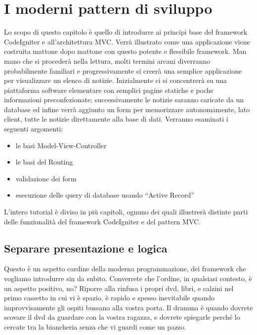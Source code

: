 \chapter{I moderni pattern di sviluppo}
\label{cap:pattern}

Lo scopo di questo capitolo è quello di introdurre ai principi base del framework CodeIgniter e all'architettura \ac{MVC}. Verrà illustrato come una applicazione viene costruita mattone dopo mattone con questo potente e flessibile framework. Man mano che si procederà nella lettura, molti termini arcani diverranno probabilmente familiari e progressivamente si creerà una semplice applicazione per visualizzare un elenco di notizie. Inizialmente ci si concentrerà su una piattaforma software elementare con semplici pagine statiche e poche informazioni preconfezionate; successivamente le notizie saranno caricate da un database ed infine verrà aggiunto un form per memorizzare autonomamente, lato client, tutte le notizie direttamente alla base di dati. Verranno esaminati i seguenti argomenti:

\begin{itemize}
\item le basi Model-View-Controller
\item le basi del Routing
\item validazione dei form
\item esecuzione delle query di database usando “Active Record”
\end{itemize}

L'intero tutorial è diviso in più capitoli, ognuno dei quali illustrerà distinte parti delle funzionalità del framework CodeIgniter e del pattern \ac{MVC}.

\section{Separare presentazione e logica}
Questo è un aspetto cardine della moderna programmazione, dei framework che vogliamo introdurre sin da subito. Converrete che l'ordine, in qualsiasi contesto, è un aspetto positivo, no? Riporre alla rinfusa i propri dvd, libri, e calzini nel primo cassetto in cui vi è spazio, è rapido e spesso inevitabile quando improvvisamente gli ospiti bussano alla vostra porta. Il dramma è quando dovrete scovare il dvd da guardare con la vostra ragazza, e dovrete spiegarle perché lo cercate tra la biancheria senza che vi guardi come un pazzo.

